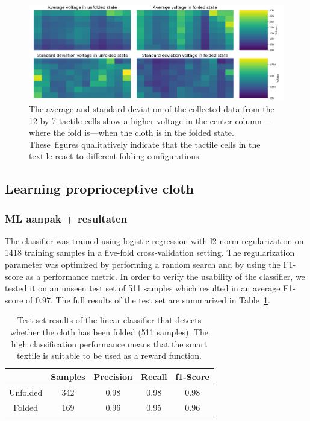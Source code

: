 \documentclass[\home/main.tex]{subfiles}
\begin{document}
\begin{figure}[H]
\centering
\includegraphics[width=\textwidth, keepaspectratio]{figures/sensor_data_over_states.png}
\caption{The average and standard deviation of the collected data from the 12 by 7 tactile cells show a higher voltage in the center column---where the fold is---when the cloth is in the folded state. These~figures qualitatively indicate that the tactile cells in the textile react to different folding configurations. }
\label{fig:sensor_data}
\end{figure}

\subsection{Learning proprioceptive cloth }
\subsubsection{ML aanpak + resultaten}

The classifier was trained using logistic regression with l2-norm regularization on 1418 training samples in a five-fold cross-validation setting. The regularization parameter was optimized by performing a random search and by using the F1-score as a performance metric. In order to verify the usability of the classifier, we tested it on an unseen test set of 511 samples which resulted in an average F1-score of $0.97$. The full results of the test set are summarized in Table~\ref{table:classifier_results}.
\begin{table}[H]
\centering
\caption{Test set results of the linear classifier that detects whether the cloth has been folded (511 samples). The high classification performance means that the smart textile is suitable to be used as a reward function.}
\label{table:classifier_results}
\begin{tabular}{ccccc}
\toprule
& \textbf{Samples} & \textbf{Precision} & \textbf{Recall} & \textbf{f1-Score} \\
\midrule
Unfolded &  342 &     0.98    &  0.98  &    0.98 \\
Folded & 169  &       0.96  & 0.95  &    0.96 \\
\bottomrule
\end{tabular}
\end{table}
\end{document}
